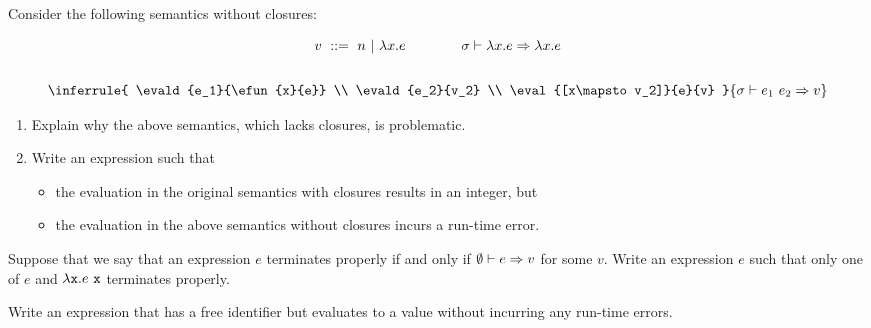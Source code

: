 \begin{exercise}

Consider the following semantics without closures:

\[
\begin{array}{c}
  v\ ::=\ n\ |\ \efun{x}{e} \qquad\qquad
  \evald{\efun{x}{e}}{\efun{x}{e}}
  \\[2em]
  \inferrule
  { \evald{e_1}{\efun{x}{e}} \\
    \evald{e_2}{v_2} \\
    \eval{[x\mapsto v_2]}{e}{v} }
  { \evald{\eapp{e_1}{e_2}}{v} }
\end{array}
\]

\begin{enumerate}
  \item
    Explain why the above semantics, which lacks closures, is problematic.
  \item
    Write an \Lang expression such that
    \begin{itemize}
        \item the evaluation in the original semantics with closures results
          in an integer, but
        \item the evaluation in the above semantics without closures incurs
          a run-time error.
    \end{itemize}
\end{enumerate}

\end{exercise}

\begin{exercise}

Suppose that we say that an expression $e$ terminates properly if and only
if $\emptyset\vdash e\Rightarrow v$ for some $v$. Write an \Lang expression $e$ such
that only one of $e$ and $\lambda\texttt{x}.e\ \texttt{x}$ terminates properly.

\end{exercise}

\begin{exercise}

Write an \Lang expression that has a free identifier but
evaluates to a value without incurring any run-time errors.

\end{exercise}

